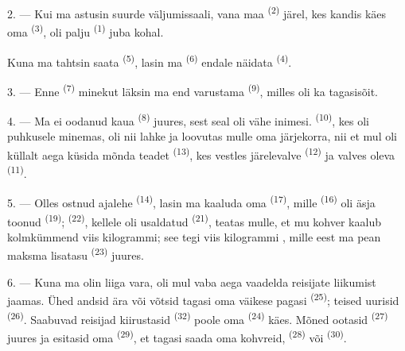 2. --- Kui ma astusin suurde väljumissaali, vana maa
\textsuperscript{(2)} järel, kes kandis käes oma 
\textsuperscript{(3)}, oli palju  \textsuperscript{(1)} juba kohal.

Kuna ma tahtsin saata  \textsuperscript{(5)}, lasin ma
 \textsuperscript{(6)} endale näidata 
\textsuperscript{(4)}.

3. --- Enne  \textsuperscript{(7)} minekut läksin ma end varustama
 \textsuperscript{(9)}, milles oli ka tagasisõit.

4. --- Ma ei oodanud kaua  \textsuperscript{(8)} juures, sest seal oli vähe
inimesi.  \textsuperscript{(10)}, kes oli puhkusele minemas, oli nii lahke
ja loovutas mulle oma järjekorra, nii et mul oli küllalt aega küsida mõnda teadet
 \textsuperscript{(13)}, kes vestles järelevalve 
\textsuperscript{(12)} ja valves oleva  \textsuperscript{(11)}.

\VUsaut{3.0mm}

5. --- Olles ostnud ajalehe  \textsuperscript{(14)}, lasin ma
kaaluda oma  \textsuperscript{(17)}, mille 
\textsuperscript{(16)} oli äsja toonud  \textsuperscript{(19)};
 \textsuperscript{(22)}, kellele oli usaldatud 
\textsuperscript{(21)}, teatas mulle, et mu kohver kaalub kolmkümmend viis kilogrammi;
see tegi viis kilogrammi , mille eest ma pean maksma lisatasu
 \textsuperscript{(23)} juures.

6. --- Kuna ma olin liiga vara, oli mul vaba aega vaadelda reisijate liikumist jaamas.
Ühed andsid ära või võtsid tagasi oma väikese pagasi 
\textsuperscript{(25)}; teised uurisid  \textsuperscript{(26)}.
Saabuvad reisijad kiirustasid  \textsuperscript{(32)} poole oma
 \textsuperscript{(24)} käes. Mõned ootasid 
\textsuperscript{(27)} juures ja esitasid oma  \textsuperscript{(29)},
et tagasi saada oma kohvreid,  \textsuperscript{(28)} või 
\textsuperscript{(30)}.


